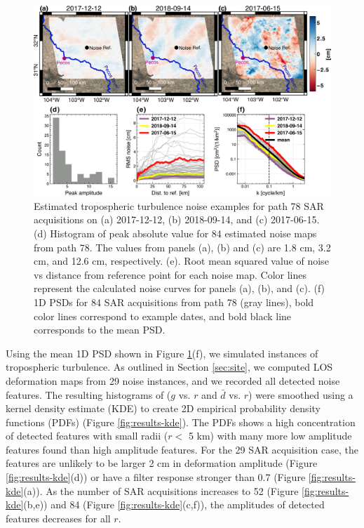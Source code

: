 \documentclass{utexasthesis}
\begin{document}
\begin{figure}[hbt!]
\centering 
\includegraphics[width=0.98\linewidth]{paper2/figures/figure5_noise_path78.png}
\caption{Estimated tropospheric turbulence noise examples for path 78 SAR acquisitions on (a) 2017-12-12, (b) 2018-09-14, and (c) 2017-06-15.
(d) Histogram of peak absolute value for 84 estimated noise maps from path 78. The values from panels (a), (b) and (c) are 1.8 cm, 3.2 cm, and 12.6 cm, respectively. 
(e). Root mean squared value of noise vs distance from reference point for each noise map. Color lines represent the calculated noise curves for panels (a), (b), and (c).
(f) 1D PSDs for 84 SAR acquisitions from path 78 (gray lines), bold color lines correspond to example dates, and bold black line corresponds to the mean PSD. 
}
\label{fig:results-noise}
\end{figure}



Using the mean 1D PSD shown in Figure \ref{fig:results-noise}(f), we simulated instances of tropospheric turbulence.
As outlined in Section \ref{sec:site}, we computed LOS deformation maps from 29 noise instances, and we recorded all detected noise features. The resulting histograms of ($g$ vs. $r$ and $\bar{d}$ vs. $r$) were smoothed using a kernel density estimate (KDE) \citep{Scott2015MultivariateDensityEstimation} to create 2D empirical probability density functions (PDFs) (Figure \ref{fig:results-kde}). The PDFs shows a high concentration of detected features with small radii ($r <$ 5 km) with many more low amplitude features found than high amplitude features. For the 29 SAR acquisition case, the features are unlikely to be larger 2 cm in deformation amplitude (Figure \ref{fig:results-kde}(d)) or have a filter response stronger than 0.7 (Figure \ref{fig:results-kde}(a)). As the number of SAR acquisitions increases to 52 (Figure \ref{fig:results-kde}(b,e)) and 84 (Figure \ref{fig:results-kde}(c,f)), the amplitudes of detected features decreases for all $r$.
\end{document}
